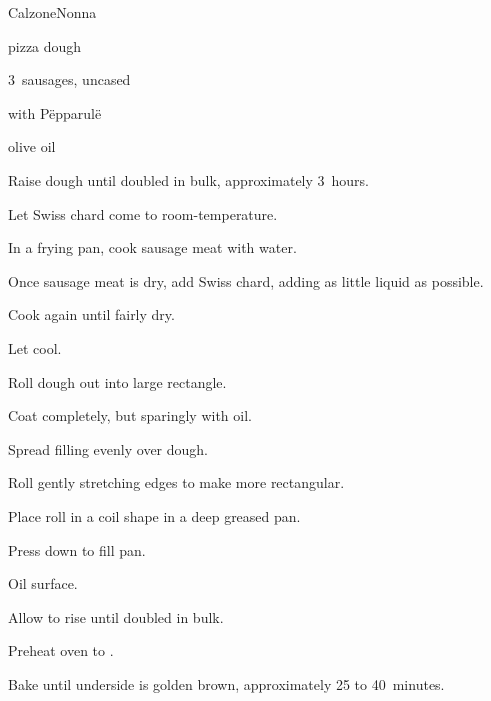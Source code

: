 \begin{recipe}{Calzone}{Nonna}{}

\begin{ingredients}
\item pizza dough
\item 3~sausages, uncased
\item {} with P\"epparul\"e
\item olive oil
\end{ingredients}

\begin{directions}
\item Raise dough until doubled in bulk, approximately 3~hours.
\item Let Swiss chard come to room-temperature.
\item In a frying pan, cook sausage meat with \C{\quarter} water.
\item Once sausage meat is dry, add Swiss chard, adding as little liquid as possible.
\item Cook again until fairly dry.
\item Let cool.
\item Roll dough out into large rectangle.
\item Coat completely, but sparingly with oil.
\item Spread filling evenly over dough.
\item Roll gently stretching edges to make more rectangular.
\item Place roll in a coil shape in a deep greased pan.
\item Press down to fill pan.
\item Oil surface.
\item Allow to rise until doubled in bulk.
\item Preheat oven to .
\item Bake until underside is golden brown, approximately 25 to 40~minutes.
\end{directions}

\end{recipe}
